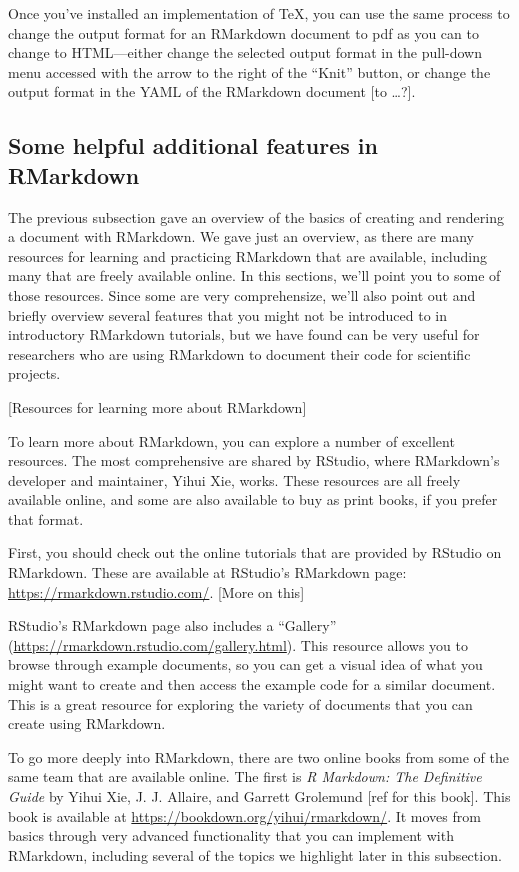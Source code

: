 \documentclass[]{tufte-book}
\begin{document}
Once you've installed an implementation of TeX, you can use the same process
to change the output format for an RMarkdown document to pdf as you can to change
to HTML---either change the selected output format in the pull-down menu accessed
with the arrow to the right of the ``Knit'' button, or change the output format
in the YAML of the RMarkdown document {[}to \ldots?{]}.

\hypertarget{some-helpful-additional-features-in-rmarkdown}{%
\subsection{Some helpful additional features in RMarkdown}\label{some-helpful-additional-features-in-rmarkdown}}

The previous subsection gave an overview of the basics of creating and
rendering a document with RMarkdown. We gave just an overview, as there are
many resources for learning and practicing RMarkdown that are available, including
many that are freely available online. In this sections, we'll point you to
some of those resources. Since some are very comprehensize, we'll also point out
and briefly overview several features that you might not be introduced to in
introductory RMarkdown tutorials, but we have found can be very useful
for researchers who are using RMarkdown to document their code for scientific
projects.

{[}Resources for learning more about RMarkdown{]}

To learn more about RMarkdown, you can explore a number of excellent resources.
The most comprehensive are shared by RStudio, where RMarkdown's developer
and maintainer, Yihui Xie, works. These resources are all freely available
online, and some are also available to buy as print books, if you prefer that
format.

First, you should check out the online tutorials that are provided by RStudio on
RMarkdown. These are available at RStudio's RMarkdown page:
\url{https://rmarkdown.rstudio.com/}. {[}More on this{]}

RStudio's RMarkdown page also includes a ``Gallery''
(\url{https://rmarkdown.rstudio.com/gallery.html}). This resource allows you to browse
through example documents, so you can get a visual idea of what you might want
to create and then access the example code for a similar document. This is a
great resource for exploring the variety of documents that you can create
using RMarkdown.

To go more deeply into RMarkdown, there are two online books from some of the
same team that are available online. The first is \emph{R Markdown: The Definitive
Guide} by Yihui Xie, J. J. Allaire, and Garrett Grolemund {[}ref for this book{]}.
This book is available at \url{https://bookdown.org/yihui/rmarkdown/}. It moves from
basics through very advanced functionality that you can implement with RMarkdown,
including several of the topics we highlight later in this subsection.
\end{document}

